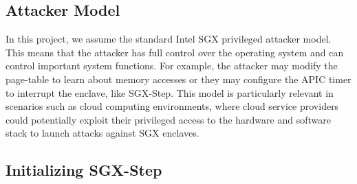 \documentclass{llncs}
\begin{document}

\subsection{Attacker Model}

In this project, we assume the standard Intel SGX privileged attacker model.
This means that the attacker has full control over the operating system
and can control important system functions.
For example, the attacker may modify the page-table to learn about memory accesses
or they may configure the APIC timer to interrupt the enclave, like SGX-Step.
This model is particularly relevant in scenarios such as cloud computing
environments, where cloud service providers could potentially exploit their
privileged access to the hardware and software stack to launch attacks against SGX enclaves.

\subsection{Initializing SGX-Step}
\end{document}
